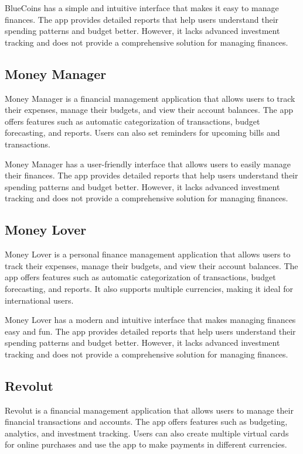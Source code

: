BlueCoins has a simple and intuitive interface that makes it easy to manage finances. The app provides detailed reports that help users understand their spending patterns and budget better. However, it lacks advanced investment tracking and does not provide a comprehensive solution for managing finances.

\subsection{Money Manager}
Money Manager is a financial management application that allows users to track their expenses, manage their budgets, and view their account balances. The app offers features such as automatic categorization of transactions, budget forecasting, and reports. Users can also set reminders for upcoming bills and transactions.

Money Manager has a user-friendly interface that allows users to easily manage their finances. The app provides detailed reports that help users understand their spending patterns and budget better. However, it lacks advanced investment tracking and does not provide a comprehensive solution for managing finances.

\subsection{Money Lover}
Money Lover is a personal finance management application that allows users to track their expenses, manage their budgets, and view their account balances. The app offers features such as automatic categorization of transactions, budget forecasting, and reports. It also supports multiple currencies, making it ideal for international users.

Money Lover has a modern and intuitive interface that makes managing finances easy and fun. The app provides detailed reports that help users understand their spending patterns and budget better. However, it lacks advanced investment tracking and does not provide a comprehensive solution for managing finances.

\subsection{Revolut}
Revolut is a financial management application that allows users to manage their financial transactions and accounts. The app offers features such as budgeting, analytics, and investment tracking. Users can also create multiple virtual cards for online purchases and use the app to make payments in different currencies.

